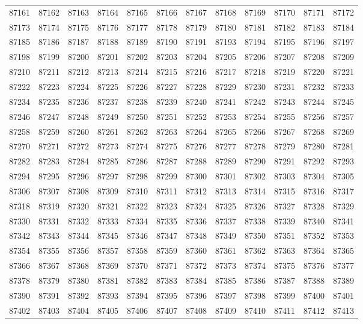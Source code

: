 \begin{center}
\begin{longtable}{llllllllllll}
87161 &87162 &87163 &87164 &87165 &87166 &87167 &87168 &87169 &87170 &87171 &87172 \\
87173 &87174 &87175 &87176 &87177 &87178 &87179 &87180 &87181 &87182 &87183 &87184 \\
87185 &87186 &87187 &87188 &87189 &87190 &87191 &87193 &87194 &87195 &87196 &87197 \\
87198 &87199 &87200 &87201 &87202 &87203 &87204 &87205 &87206 &87207 &87208 &87209 \\
87210 &87211 &87212 &87213 &87214 &87215 &87216 &87217 &87218 &87219 &87220 &87221 \\
87222 &87223 &87224 &87225 &87226 &87227 &87228 &87229 &87230 &87231 &87232 &87233 \\
87234 &87235 &87236 &87237 &87238 &87239 &87240 &87241 &87242 &87243 &87244 &87245 \\
87246 &87247 &87248 &87249 &87250 &87251 &87252 &87253 &87254 &87255 &87256 &87257 \\
87258 &87259 &87260 &87261 &87262 &87263 &87264 &87265 &87266 &87267 &87268 &87269 \\
87270 &87271 &87272 &87273 &87274 &87275 &87276 &87277 &87278 &87279 &87280 &87281 \\
87282 &87283 &87284 &87285 &87286 &87287 &87288 &87289 &87290 &87291 &87292 &87293 \\
87294 &87295 &87296 &87297 &87298 &87299 &87300 &87301 &87302 &87303 &87304 &87305 \\
87306 &87307 &87308 &87309 &87310 &87311 &87312 &87313 &87314 &87315 &87316 &87317 \\
87318 &87319 &87320 &87321 &87322 &87323 &87324 &87325 &87326 &87327 &87328 &87329 \\
87330 &87331 &87332 &87333 &87334 &87335 &87336 &87337 &87338 &87339 &87340 &87341 \\
87342 &87343 &87344 &87345 &87346 &87347 &87348 &87349 &87350 &87351 &87352 &87353 \\
87354 &87355 &87356 &87357 &87358 &87359 &87360 &87361 &87362 &87363 &87364 &87365 \\
87366 &87367 &87368 &87369 &87370 &87371 &87372 &87373 &87374 &87375 &87376 &87377 \\
87378 &87379 &87380 &87381 &87382 &87383 &87384 &87385 &87386 &87387 &87388 &87389 \\
87390 &87391 &87392 &87393 &87394 &87395 &87396 &87397 &87398 &87399 &87400 &87401 \\
87402 &87403 &87404 &87405 &87406 &87407 &87408 &87409 &87410 &87411 &87412 &87413 \\

\end{longtable}
\end{center}
